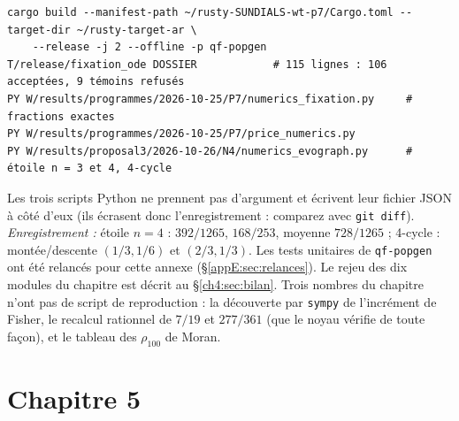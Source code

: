 \begin{lstlisting}[style=appC,language={}]
cargo build --manifest-path ~/rusty-SUNDIALS-wt-p7/Cargo.toml --target-dir ~/rusty-target-ar \
    --release -j 2 --offline -p qf-popgen
T/release/fixation_ode DOSSIER            # 115 lignes : 106 acceptées, 9 témoins refusés
PY W/results/programmes/2026-10-25/P7/numerics_fixation.py     # fractions exactes
PY W/results/programmes/2026-10-25/P7/price_numerics.py
PY W/results/proposal3/2026-10-26/N4/numerics_evograph.py      # étoile n = 3 et 4, 4-cycle
\end{lstlisting}
Les trois scripts Python ne prennent pas d'argument et écrivent leur fichier JSON à côté d'eux (ils écrasent donc
l'enregistrement : comparez avec \texttt{git diff}). \emph{Enregistrement :} étoile $n=4$ : $392/1265$, $168/253$,
moyenne $728/1265$ ; 4-cycle : montée/descente $(1/3,1/6)$ et $(2/3,1/3)$. Les tests unitaires de \texttt{qf-popgen} ont
été relancés pour cette annexe (§\ref{appE:sec:relances}). Le rejeu \lean{leanchecker} des dix modules du chapitre est
décrit au §\ref{ch4:sec:bilan}. Trois nombres du chapitre n'ont pas de script de reproduction : la découverte par
\texttt{sympy} de l'incrément de Fisher, le recalcul rationnel de $7/19$ et $277/361$ (que le noyau vérifie de toute
façon), et le tableau des $\rho_{100}$ de Moran.

\section{Chapitre 5}\label{appE:sec:ch5}


